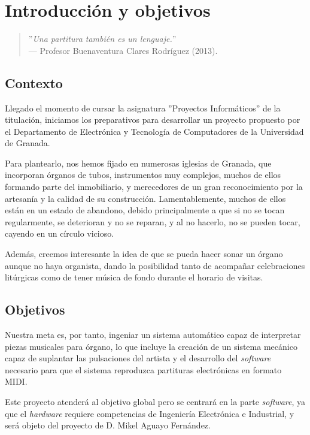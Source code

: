 \chapter{Introducción y objetivos}
\label{cap:capitulo_1}

\begin{quote}
	\small \flushright ''\textit{Una partitura también es un lenguaje.}'' \\
	--- Profesor Buenaventura Clares Rodríguez (2013).
\end{quote}

\section{Contexto}

Llegado el momento de cursar la asignatura ''Proyectos Informáticos'' de la titulación, iniciamos los preparativos para desarrollar un proyecto propuesto por el Departamento de Electrónica y Tecnología de Computadores de la Universidad de Granada.

Para plantearlo, nos hemos fijado en numerosas iglesias de Granada, que incorporan órganos de tubos, instrumentos muy complejos, muchos de ellos formando parte del inmobiliario, y merecedores de un gran reconocimiento por la artesanía y la calidad de su construcción. Lamentablemente, muchos de ellos están en un estado de abandono, debido principalmente a que si no se tocan regularmente, se deterioran y no se reparan, y al no hacerlo, no se pueden tocar, cayendo en un círculo vicioso.

Además, creemos interesante la idea de que se pueda hacer sonar un órgano aunque no haya organista, dando la posibilidad tanto de acompañar celebraciones litúrgicas como de tener música de fondo durante el horario de visitas.

\newpage

\section{Objetivos}

Nuestra meta es, por tanto, ingeniar un sistema automático capaz de interpretar piezas musicales para órgano, lo que incluye la creación de un sistema mecánico capaz de suplantar las pulsaciones del artista y el desarrollo del \textit{software} necesario para que el sistema reproduzca partituras electrónicas en formato MIDI.

Este proyecto atenderá al objetivo global pero se centrará en la parte \textit{software}, ya que el \textit{hardware} requiere competencias de Ingeniería Electrónica e Industrial, y será objeto del proyecto de D. Mikel Aguayo Fernández.

